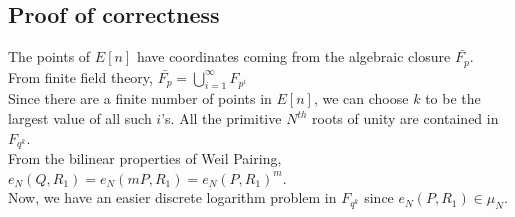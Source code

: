 \subsection{Proof of correctness} 

The points of $E[n]$ have coordinates coming from the algebraic closure $\bar{F_p}$.  \\
From finite field theory, $\bar{F_p} = \bigcup\limits_{i = 1}^{\infty} F_{p^i}$ \\
Since there are a finite number of points in $E[n]$, we can choose $k$ to be the largest value of all such $i$'s. 
All the primitive $N^{th}$ roots of unity are contained in $F_{q^k}$. \\
From the bilinear properties of Weil Pairing, $e_N(Q, R_1) = e_N(mP, R_1) = {e_N(P, R_1)}^m$. \\
Now, we have an easier discrete logarithm problem in $F_{q^k}$ since $e_N(P, R_1) \in \mu_N$. 

